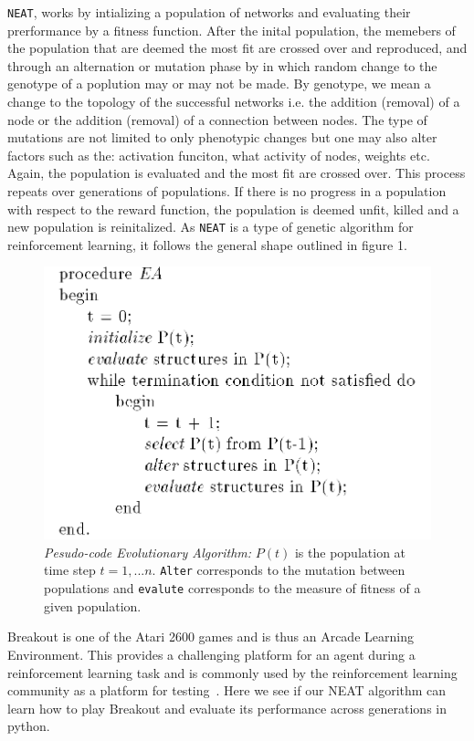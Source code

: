 \documentclass[letterpaper, twocolumn, conference]{article}
\begin{document}
\texttt{NEAT}, works by intializing a population of networks and evaluating their prerformance by a fitness function. After the inital population, the memebers of the population that are deemed the most fit are crossed over and reproduced, and through an alternation or mutation phase by in which random change to the genotype of a poplution may or may not be made. By genotype, we mean a change to the topology of the successful networks i.e. the addition (removal) of a node or the addition (removal) of a connection between nodes. The type of mutations are not limited to only phenotypic changes but one may also alter factors such as the:  activation funciton, what activity of nodes, weights etc. Again, the population is evaluated and the most fit are crossed over. This process repeats over generations of populations. If there is no progress in a population with respect to the reward function, the population is deemed unfit, killed and a new population is reinitalized. As \texttt{NEAT} is a type of genetic algorithm for reinforcement learning, it follows the general shape outlined in figure 1.

\begin{figure}
    \includegraphics{EA.png}
    \caption{\textit{Pesudo-code Evolutionary Algorithm:} $P(t)$ is the population at time step $t=1,...n$. \texttt{Alter} corresponds to the mutation between populations and \texttt{evalute} corresponds to the measure of fitness of a given population.  }
\end{figure}

Breakout is one of the  Atari 2600 games  and is thus an Arcade Learning Environment. This provides a challenging platform for an agent during a reinforcement learning task and is commonly used by the reinforcement learning community as a platform for testing~\cite{Machado17}. Here we see if our NEAT algorithm can learn how to play Breakout and evaluate its performance across generations in python.
\end{document}
